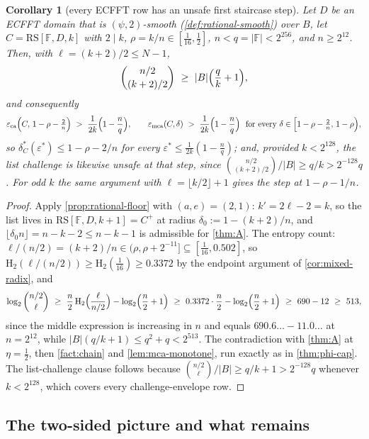 \documentclass[11pt]{article}
\newtheorem{corollary}[theorem]{Corollary}
\theoremstyle{definition}
\theoremstyle{remark}
\newcommand{\F}{\mathbb{F}}
\newcommand{\B}{B}
\newcommand{\RS}{\mathrm{RS}}
\newcommand{\eca}{\varepsilon_{\mathrm{ca}}}
\newcommand{\emca}{\varepsilon_{\mathrm{mca}}}
\newcommand{\Hb}{\mathrm{H}_2}
\begin{document}
\begin{corollary}[every ECFFT row has an unsafe first staircase step]\label{cor:ecfft-onestep}
Let $D$ be an ECFFT domain that is $(\psi,2)$-smooth \textup(\cref{def:rational-smooth}\textup) over $\B$, let $C=\RS[\F,D,k]$ with $2\mid k$, $\rho=k/n\in[\tfrac1{16},\tfrac12]$, $n<q=|\F|<2^{256}$, and $n\ge2^{12}$. Then, with $\ell=(k+2)/2\le N-1$,
\[
\binom{n/2}{(k+2)/2}\ \ge\ |\B|\Bigl(\frac qk+1\Bigr),
\]
and consequently
\[
\eca\Bigl(C,\,1-\rho-\tfrac2n\Bigr)\ >\ \frac1{2k}\Bigl(1-\frac nq\Bigr),
\qquad
\emca(C,\delta)\ >\ \frac1{2k}\Bigl(1-\frac nq\Bigr)\ \ \text{for every }\delta\in\Bigl[1-\rho-\tfrac2n,\,1-\rho\Bigr),
\]
so $\delta^*_C(\varepsilon^*)\le1-\rho-2/n$ for every $\varepsilon^*\le\frac1{2k}(1-\frac nq)$; and, provided $k<2^{128}$, the list challenge is likewise unsafe at that step, since $\binom{n/2}{(k+2)/2}/|\B|\ge q/k>2^{-128}q$. For odd $k$ the same argument with $\ell=\lfloor k/2\rfloor+1$ gives the step at $1-\rho-1/n$.
\end{corollary}

\begin{proof}
Apply \cref{prop:rational-floor} with $(a,e)=(2,1)$: $k'=2\ell-2=k$, so the list lives in $\RS[\F,D,k+1]=C^+$ at radius $\delta_0:=1-(k+2)/n$, and $\lfloor\delta_0n\rfloor=n-k-2\le n-k-1$ is admissible for \cref{thm:A}. The entropy count: $\ell/(n/2)=(k+2)/n\in(\rho,\rho+2^{-11}]\subseteq[\tfrac1{16},0.502]$, so $\Hb(\ell/(n/2))\ge\Hb(\tfrac1{16})\ge0.3372$ by the endpoint argument of \cref{cor:mixed-radix}, and
\[
\log_2\binom{n/2}{\ell}\ \ge\ \frac n2\,\Hb\Bigl(\frac{\ell}{n/2}\Bigr)-\log_2\Bigl(\frac n2+1\Bigr)\ \ge\ 0.3372\cdot\frac n2-\log_2\Bigl(\frac n2+1\Bigr)\ \ge\ 690-12\ \ge\ 513,
\]
since the middle expression is increasing in $n$ and equals $690.6\ldots-11.0\ldots$ at $n=2^{12}$, while $|\B|(q/k+1)\le q^2+q<2^{513}$. The contradiction with \cref{thm:A} at $\eta=\frac12$, then \cref{fact:chain} and \cref{lem:mca-monotone}, run exactly as in \cref{thm:phi-cap}. The list-challenge clause follows because $\binom{n/2}{\ell}/|\B|\ge q/k+1>2^{-128}q$ whenever $k<2^{128}$, which covers every challenge-envelope row.
\end{proof}
\subsection{The two-sided picture and what remains}\label{sec:discharge-status}
\end{document}
